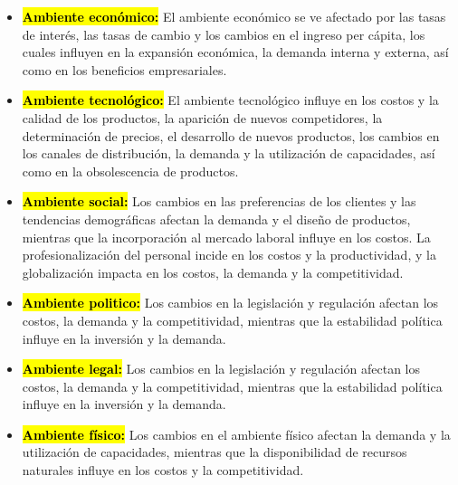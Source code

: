 \documentclass{templateNote}
\newcommand{\hlcolor}[2]{{\sethlcolor{#1}\hl{#2}}}
\begin{document}
\begin{itemize}
    \item \hlcolor{Verde}{\textbf{Ambiente económico:}} El ambiente económico se ve afectado por las tasas de interés, las tasas de cambio y los cambios en el ingreso per cápita, los cuales influyen en la expansión económica, la demanda interna y externa, así como en los beneficios empresariales.
    
    \item \hlcolor{Verde}{\textbf{Ambiente tecnológico:}} El ambiente tecnológico influye en los costos y la calidad de los productos, la aparición de nuevos competidores, la determinación de precios, el desarrollo de nuevos productos, los cambios en los canales de distribución, la demanda y la utilización de capacidades, así como en la obsolescencia de productos.
    
    \item \hlcolor{Verde}{\textbf{Ambiente social:}} Los cambios en las preferencias de los clientes y las tendencias demográficas afectan la demanda y el diseño de productos, mientras que la incorporación al mercado laboral influye en los costos. La profesionalización del personal incide en los costos y la productividad, y la globalización impacta en los costos, la demanda y la competitividad.
    
    \item \hlcolor{Verde}{\textbf{Ambiente politico:}} Los cambios en la legislación y regulación afectan los costos, la demanda y la competitividad, mientras que la estabilidad política influye en la inversión y la demanda.
    
    \item \hlcolor{Verde}{\textbf{Ambiente legal:}} Los cambios en la legislación y regulación afectan los costos, la demanda y la competitividad, mientras que la estabilidad política influye en la inversión y la demanda.
    
    \item \hlcolor{Verde}{\textbf{Ambiente físico:}} Los cambios en el ambiente físico afectan la demanda y la utilización de capacidades, mientras que la disponibilidad de recursos naturales influye en los costos y la competitividad.
\end{itemize}
\end{document}

